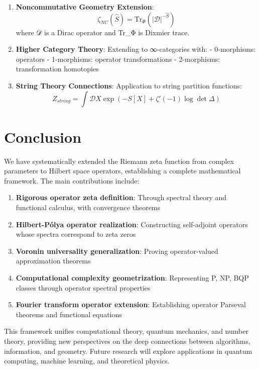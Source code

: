 \documentclass[12pt]{article}
\theoremstyle{plain}
\theoremstyle{definition}
\begin{document}
\begin{enumerate}
\item \textbf{Noncommutative Geometry Extension}:
$$\zeta_{NC}(\hat{S}) = \text{Tr}_{\Phi}(|\mathcal{D}|^{-\hat{S}})$$
where 𝒟 is a Dirac operator and Tr_Φ is Dixmier trace.

\item \textbf{Higher Category Theory}: Extending to ∞-categories with:
- 0-morphisms: operators
- 1-morphisms: operator transformations
- 2-morphisms: transformation homotopies

\item \textbf{String Theory Connections}: Application to string partition functions:
$$Z_{string} = \int \mathcal{D}X \exp\left(-S[X] + \zeta'(-1) \log \det \Delta\right)$$
\end{enumerate}

\section{Conclusion}

We have systematically extended the Riemann zeta function from complex parameters to Hilbert space operators, establishing a complete mathematical framework. The main contributions include:

\begin{enumerate}
\item \textbf{Rigorous operator zeta definition}: Through spectral theory and functional calculus, with convergence theorems
\item \textbf{Hilbert-Pólya operator realization}: Constructing self-adjoint operators whose spectra correspond to zeta zeros
\item \textbf{Voronin universality generalization}: Proving operator-valued approximation theorems
\item \textbf{Computational complexity geometrization}: Representing P, NP, BQP classes through operator spectral properties
\item \textbf{Fourier transform operator extension}: Establishing operator Parseval theorems and functional equations
\end{enumerate}

This framework unifies computational theory, quantum mechanics, and number theory, providing new perspectives on the deep connections between algorithms, information, and geometry. Future research will explore applications in quantum computing, machine learning, and theoretical physics.
\end{document}
